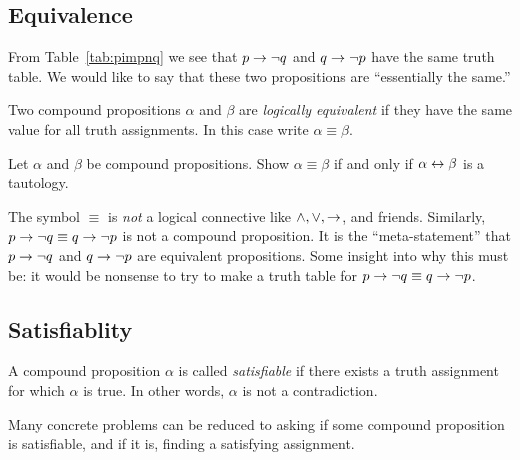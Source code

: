 \subsection{Equivalence}
From Table~\ref{tab:pimpnq} we see that $p \rightarrow \lnot q$ and $q
\rightarrow \lnot p$ have the same truth table.  We would like to say
that these two propositions are ``essentially the same.''

\begin{defn}
  Two compound propositions $\alpha$ and $\beta$ are \emph{logically
    equivalent} if they have the same value for all truth
  assignments.  In this case write $\alpha \equiv \beta$.
\end{defn}

\begin{exr}
  Let $\alpha$ and $\beta$ be compound propositions.  Show $\alpha
  \equiv \beta$ if and only if $\alpha \leftrightarrow \beta$ is a tautology.
\end{exr}

\begin{danger}
  The symbol $\equiv$ is \emph{not} a logical connective like $\land,
  \lor, \rightarrow$, and friends.  Similarly,
  $p \rightarrow \lnot q \equiv q \rightarrow \lnot p$ is not a compound
  proposition.  It is the ``meta-statement'' that
  $p \rightarrow \lnot q$ and $q \rightarrow \lnot p$ are equivalent
  propositions.  Some insight into why this must be: it would be
  nonsense to try to make a truth table for
  $p \rightarrow \lnot q \equiv q \rightarrow \lnot p$.
\end{danger}

\subsection{Satisfiablity}
\begin{defn}
  A compound proposition $\alpha$ is called \emph{satisfiable} if
  there exists a truth assignment for which $\alpha$ is true.  In
  other words, $\alpha$ is not a contradiction.
\end{defn}

Many concrete problems can be reduced to asking if some compound
proposition is satisfiable, and if it is, finding a satisfying
assignment.